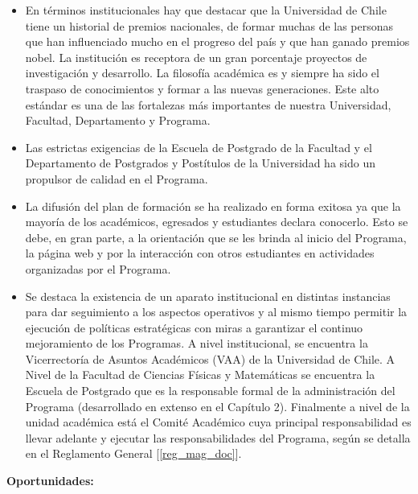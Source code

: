 \begin{itemize}
\item En términos institucionales hay que destacar que la Universidad de Chile tiene un historial de premios nacionales, de formar 
muchas de las personas que han influenciado mucho en el progreso del país y que han ganado premios nobel. La institución es receptora 
de un gran porcentaje proyectos de investigación y desarrollo. La filosofía académica es y siempre ha sido el traspaso de conocimientos
y formar a las nuevas generaciones. Este alto estándar es una de las fortalezas más importantes de nuestra Universidad, Facultad, 
Departamento y Programa.
\item Las estrictas exigencias de la Escuela de Postgrado de la Facultad y el Departamento de Postgrados y Postítulos de la 
Universidad ha sido un propulsor de calidad en el Programa. 
\item La difusión del plan de formación se ha realizado en forma exitosa ya que la mayoría de los académicos, egresados y 
estudiantes declara conocerlo. Esto se debe, en gran parte, a la orientación que se les brinda al inicio del Programa, la página web y 
por la interacción con otros estudiantes en actividades organizadas por el Programa.
\item Se destaca la existencia de un aparato institucional en distintas instancias para
dar seguimiento a los aspectos operativos y al mismo tiempo permitir la ejecución de políticas estratégicas
con miras a garantizar el continuo mejoramiento de los Programas. A nivel institucional, se encuentra la
Vicerrectoría de Asuntos Académicos (VAA) de la Universidad de Chile. A Nivel de la Facultad de Ciencias
Físicas y Matemáticas se encuentra la Escuela de Postgrado que es la responsable formal de la administración
del Programa (desarrollado en extenso en el Capítulo 2). Finalmente a nivel de la unidad académica está
el Comité Académico cuya principal responsabilidad es llevar adelante y ejecutar las responsabilidades del
Programa, según se detalla en el Reglamento General [\ref{reg_mag_doc}].
\end{itemize}

\noindent\textbf{Oportunidades:}

